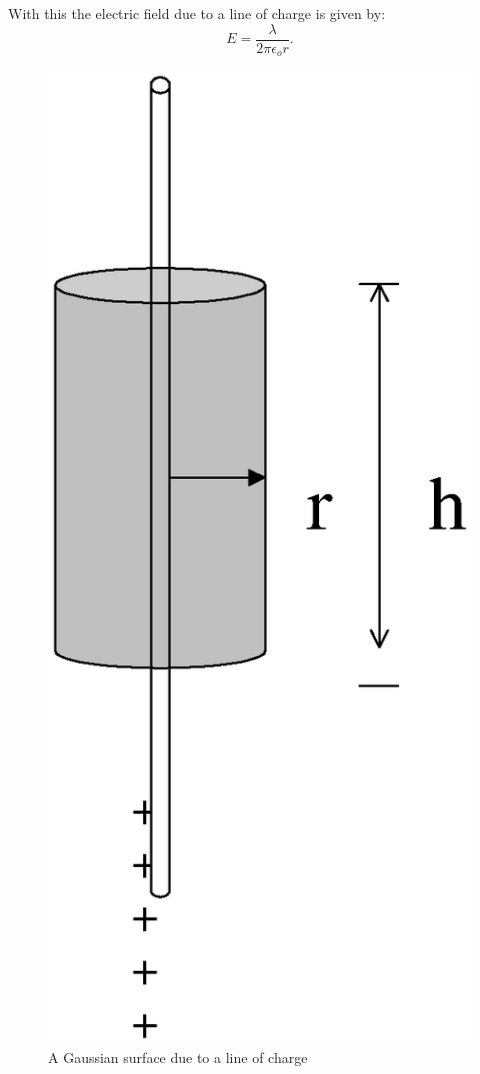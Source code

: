 {\noindent With this the electric field due to a line of charge is
given by:
\begin{equation}
E= \frac{\lambda}{2\pi\epsilon_o r}.\label{line}
\end{equation}

\begin{figure}[!htb]
\centering
\epsfxsize=6cm \includegraphics[scale=0.4]{1_electro/es3.eps}
\caption{A Gaussian
surface due to a line of charge}
 \label{es3}
\end{figure}



}
